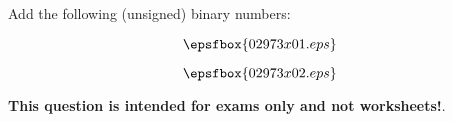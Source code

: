 

Add the following (unsigned) binary numbers:

\vskip 10pt

$$\epsfbox{02973x01.eps}$$

\vskip 10pt







$$\epsfbox{02973x02.eps}$$







{\bf This question is intended for exams only and not worksheets!}.




